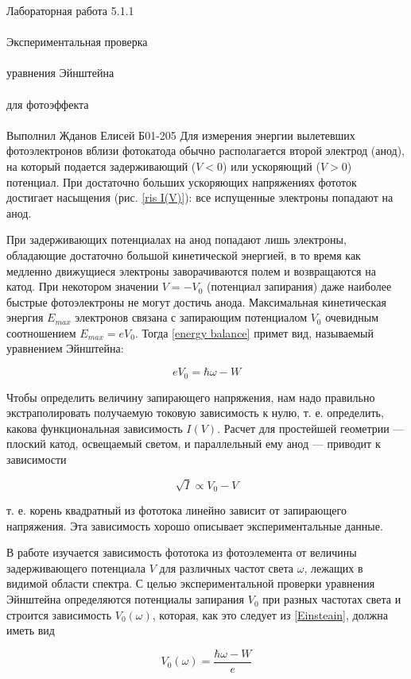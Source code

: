 \documentclass{astroedu-lab}
\begin{document}
\begin{problem}{\huge Лабораторная работа 5.1.1\\\\Экспериментальная проверка\\\\ уравнения Эйнштейна\\\\
для фотоэффекта\\\\Выполнил Жданов Елисей Б01-205}
	Для измерения энергии вылетевших фотоэлектронов вблизи фотокатода
	обычно располагается второй электрод
	(анод), на который подается задерживающий ($ V < 0 $) или ускоряющий ($ V >
	0 $) потенциал. При достаточно больших
	ускоряющих напряжениях фототок достигает насыщения (рис. \ref{ris I(V)}): все испущенные электроны попадают на анод.
	
	При задерживающих потенциалах на анод попадают лишь электроны,
	обладающие достаточно большой кинетической энергией, в то время
	как медленно движущиеся электроны заворачиваются полем и возвращаются на катод. При некотором значении $ V = -V_0 $ (потенциал запирания) даже наиболее быстрые фотоэлектроны не могут достичь
	анода.
	Максимальная кинетическая энергия $ E_{max} $ электронов связана с
	запирающим потенциалом $ V_0 $ очевидным соотношением $ E_{max} = eV_0 $. Тогда \eqref{energy balance} примет вид, называемый уравнением Эйнштейна:
	
	\begin{equation}\label{Einsteain}
	eV_0 = \hbar\omega - W 
	\end{equation}
	
	Чтобы определить величину запирающего
	напряжения, нам надо правильно экстраполировать получаемую токовую зависимость к нулю, т. е. определить, какова функциональная
	зависимость $ I(V) $. Расчет для простейшей геометрии --- плоский катод, освещаемый светом, и параллельный ему анод --- приводит к зависимости
	
	\begin{equation}\label{sqrt I = V}
	\sqrt{I} \propto V_0 - V
	\end{equation}
	
	т. е. корень квадратный из фототока линейно
	зависит от запирающего напряжения. Эта зависимость хорошо описывает экспериментальные данные.
	
	В работе изучается зависимость фототока из фотоэлемента от величины задерживающего потенциала $ V $ для различных частот света $ \omega $, лежащих в видимой области спектра. С целью экспериментальной
	проверки уравнения Эйнштейна определяются потенциалы запирания
	$ V_0 $ при разных частотах света и строится зависимость $ V_0(\omega) $, которая, как это следует из \eqref{Einsteain}, должна иметь вид
	
	\begin{equation}\label{V(w)}
	V_0 (\omega) = \dfrac{\hbar\omega - W}{e}
	\end{equation}




\end{problem}
\end{document}
